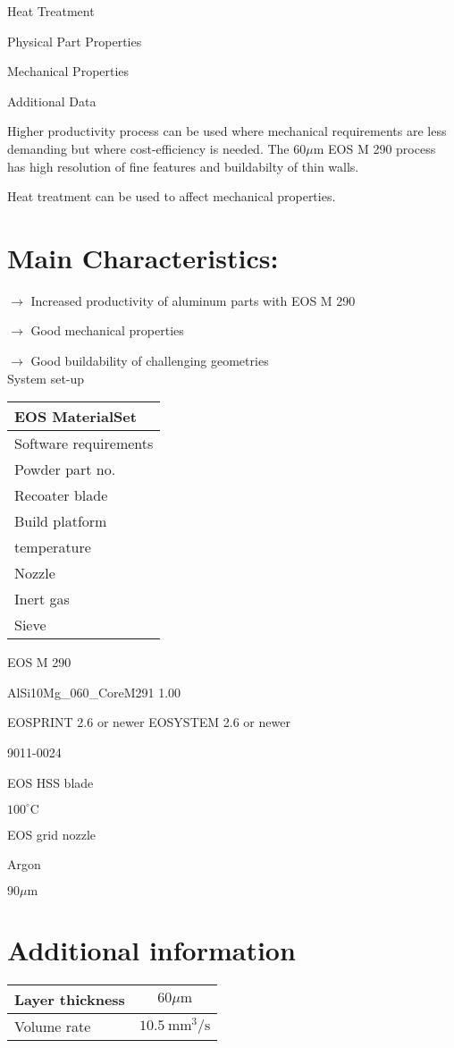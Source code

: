 \documentclass[10pt]{article}
\begin{document}
Heat Treatment

Physical Part Properties

Mechanical Properties

Additional Data

Higher productivity process can be used where mechanical requirements are less demanding but where cost-efficiency is needed. The $60 \mu \mathrm{m}$ EOS M 290 process has high resolution of fine features and buildabilty of thin walls.

Heat treatment can be used to affect mechanical properties.

\section*{Main Characteristics:}
$\longrightarrow$ Increased productivity of aluminum parts with EOS M 290

$\longrightarrow$ Good mechanical properties

$\longrightarrow$ Good buildability of challenging geometries\\
System set-up

\begin{center}
\begin{tabular}{l}
\hline
EOS MaterialSet \\
\hline
Software requirements \\
\hline
Powder part no. \\
Recoater blade \\
\hline
Build platform \\
temperature \\
Nozzle \\
\hline
Inert gas \\
\hline
Sieve \\
\hline
\end{tabular}
\end{center}

EOS M 290

AlSi10Mg\_060\_CoreM291 1.00

EOSPRINT 2.6 or newer EOSYSTEM 2.6 or newer

9011-0024

EOS HSS blade

$100^{\circ} \mathrm{C}$

EOS grid nozzle

Argon

$90 \mu \mathrm{m}$

\section*{Additional information}
\begin{center}
\begin{tabular}{lc}
\hline
Layer thickness & $60 \mu \mathrm{m}$ \\
\hline
Volume rate & $10.5 \mathrm{~mm}^{3} / \mathrm{s}$ \\
\hline
\end{tabular}
\end{center}
\end{document}
